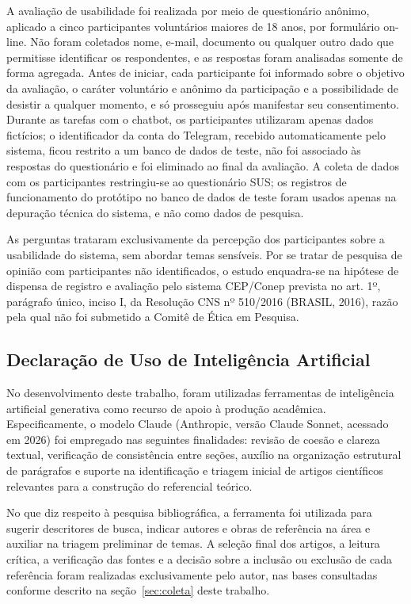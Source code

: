 \documentclass[12pt,a4paper]{extarticle}
\begin{document}
A avaliação de usabilidade foi realizada por meio de questionário anônimo, aplicado a cinco participantes voluntários maiores de 18 anos, por formulário on-line. Não foram coletados nome, e-mail, documento ou qualquer outro dado que permitisse identificar os respondentes, e as respostas foram analisadas somente de forma agregada. Antes de iniciar, cada participante foi informado sobre o objetivo da avaliação, o caráter voluntário e anônimo da participação e a possibilidade de desistir a qualquer momento, e só prosseguiu após manifestar seu consentimento. Durante as tarefas com o chatbot, os participantes utilizaram apenas dados fictícios; o identificador da conta do Telegram, recebido automaticamente pelo sistema, ficou restrito a um banco de dados de teste, não foi associado às respostas do questionário e foi eliminado ao final da avaliação. A coleta de dados com os participantes restringiu-se ao questionário SUS; os registros de funcionamento do protótipo no banco de dados de teste foram usados apenas na depuração técnica do sistema, e não como dados de pesquisa.

As perguntas trataram exclusivamente da percepção dos participantes sobre a usabilidade do sistema, sem abordar temas sensíveis. Por se tratar de pesquisa de opinião com participantes não identificados, o estudo enquadra-se na hipótese de dispensa de registro e avaliação pelo sistema CEP/Conep prevista no art. 1º, parágrafo único, inciso I, da Resolução CNS nº 510/2016 (BRASIL, 2016), razão pela qual não foi submetido a Comitê de Ética em Pesquisa.


\subsection{Declaração de Uso de Inteligência Artificial}

No desenvolvimento deste trabalho, foram utilizadas ferramentas de inteligência artificial generativa como recurso de apoio à produção acadêmica. Especificamente, o modelo Claude (Anthropic, versão Claude Sonnet, acessado em 2026) foi empregado nas seguintes finalidades: revisão de coesão e clareza textual, verificação de consistência entre seções, auxílio na organização estrutural de parágrafos e suporte na identificação e triagem inicial de artigos científicos relevantes para a construção do referencial teórico.

No que diz respeito à pesquisa bibliográfica, a ferramenta foi utilizada para sugerir descritores de busca, indicar autores e obras de referência na área e auxiliar na triagem preliminar de temas. A seleção final dos artigos, a leitura crítica, a verificação das fontes e a decisão sobre a inclusão ou exclusão de cada referência foram realizadas exclusivamente pelo autor, nas bases consultadas conforme descrito na seção~\ref{sec:coleta} deste trabalho.
\end{document}
